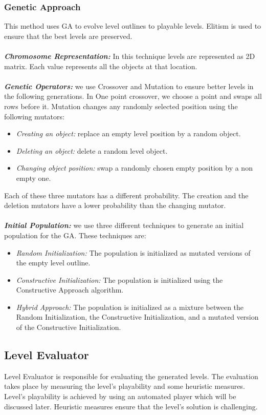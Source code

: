 \documentclass[letterpaper]{article}
\begin{document}
\subsubsection{Genetic Approach}
This method uses GA to evolve level outlines to playable levels. Elitism is used to ensure that the best levels are preserved.\\\\
\emph{\textbf{Chromosome Representation:}} In this technique levels are represented as 2D matrix. Each value represents all the objects at that location.\\\\
\emph{\textbf{Genetic Operators:}} we use Crossover and Mutation to ensure better levels in the following generations. In One point crossover, we choose a point and swaps all rows before it. Mutation changes any randomly selected position using the following mutators:
\begin{itemize}
	\item \emph{Creating an object:} replace an empty level position by a random object.
	\item \emph{Deleting an object:} delete a random level object.
	\item \emph{Changing object position:} swap a randomly chosen empty position by a non empty one.
\end{itemize}
Each of these three mutators has a different probability. The creation and the deletion mutators have a lower probability than the changing mutator.\\\\
\emph{\textbf{Initial Population:}} we use three different techniques to generate an initial population for the GA. These techniques are:
\begin{itemize}
	\item \emph{Random Initialization:} The population is initialized as mutated versions of the empty level outline.
	\item \emph{Constructive Initialization:} The population is initialized using the Constructive Approach algorithm.
	\item \emph{Hybrid Approach:} The population is initialized as a mixture between the Random Initialization, the Constructive Initialization, and a mutated version of the Constructive Initialization.
\end{itemize}

\subsection{Level Evaluator}
Level Evaluator is responsible for evaluating the generated levels. The evaluation takes place by measuring the level's playability and some heuristic measures. Level's playability is achieved by using an automated player which will be discussed later. Heuristic measures ensure that the level's solution is challenging.
\end{document}
